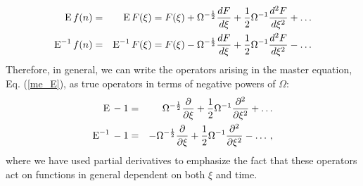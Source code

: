 \begin{eqnarray}
	\label{E_3}
	\textup{E}\,f(n) & = &\textup{E}\,F(\xi) = F(\xi)+\Omega^{-\frac{1}{2}}\frac{dF}{d\xi}+\frac{1}{2}\Omega^{-1}\frac{d^2F}{d\xi^2}+\ldots\\
	\textup{E}^{-1}\,f(n) & = &\textup{E}^{-1}\,F(\xi) = F(\xi)-\Omega^{-\frac{1}{2}}\frac{dF}{d\xi}+\frac{1}{2}\Omega^{-1}\frac{d^2F}{d\xi^2}-\ldots
	\label{E_4}
\end{eqnarray} 
Therefore, in general, we can write the operators arising in the master equation, Eq. (\ref{me_E}), as true operators in terms of negative powers of $\Omega$:
\begin{eqnarray}
	\label{E_5}
	\textup{E}\,-1      & = &  \Omega^{-\frac{1}{2}}\frac{\partial}{\partial\xi}+\frac{1}{2}\Omega^{-1}\frac{\partial^2}{\partial\xi^2}+\ldots\\
	\textup{E}^{-1}\,-1 & = & -\Omega^{-\frac{1}{2}}\frac{\partial}{\partial\xi}+\frac{1}{2}\Omega^{-1}\frac{\partial^2}{\partial\xi^2}-\ldots\,,
	\label{E_6}
\end{eqnarray}
where we have used partial derivatives to emphasize the fact that these operators act on functions in general dependent on both $\xi$ and time. 

